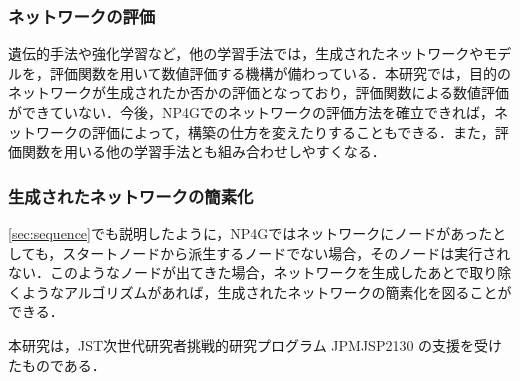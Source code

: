 \documentclass[exploratorypaper]{jsaiart} %
\begin{document}
\subsubsection{ネットワークの評価}
遺伝的手法や強化学習など，他の学習手法では，生成されたネットワークやモデルを，評価関数を用いて数値評価する機構が備わっている．本研究では，目的のネットワークが生成されたか否かの評価となっており，評価関数による数値評価ができていない．今後，NP4Gでのネットワークの評価方法を確立できれば，ネットワークの評価によって，構築の仕方を変えたりすることもできる．また，評価関数を用いる他の学習手法とも組み合わせしやすくなる．
\subsubsection{生成されたネットワークの簡素化}
\ref{sec:sequence}でも説明したように，NP4Gではネットワークにノードがあったとしても，スタートノードから派生するノードでない場合，そのノードは実行されない．このようなノードが出てきた場合，ネットワークを生成したあとで取り除くようなアルゴリズムがあれば，生成されたネットワークの簡素化を図ることができる．

\begin{acknowledgment}
本研究は，JST次世代研究者挑戦的研究プログラム JPMJSP2130 の支援を受けたものである．
\end{acknowledgment}





\begin{biography}
\end{biography}
\end{document}
